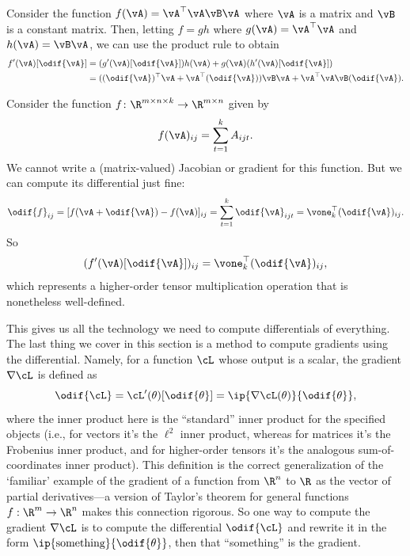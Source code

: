 \documentclass[../../book-main.tex]{subfiles}
\begin{document}
\begin{example}
    Consider the function \(f(\vA) = \vA^{\top}\vA\vB\vA\) where
    \(\vA\) is a matrix and \(\vB\) is a constant matrix. Then,
    letting \(f = gh\) where \(g(\vA) = \vA^{\top}\vA\) and \(h(\vA)
    = \vB\vA\), we can use the product rule to obtain
    \begin{align}
        f^{\prime}(\vA)[\odif{\vA}]
        &= (g^{\prime}(\vA)[\odif{\vA}])h(\vA) +
        g(\vA)(h^{\prime}(\vA)[\odif{\vA}]) \\
        &= ((\odif{\vA})^{\top}\vA + \vA^{\top}(\odif{\vA}))\vB\vA +
        \vA^{\top}\vA\vB(\odif{\vA}).
    \end{align}
\end{example}

\begin{example}
    Consider the function \(f \colon \R^{m \times n \times k} \to
    \R^{m \times n}\) given by
    \begin{equation}
        f(\vA)_{ij} = \sum_{t = 1}^{k}A_{ijt}.
    \end{equation}
    We cannot write a (matrix-valued) Jacobian or gradient for this
    function. But we can compute its differential just fine:
    \begin{equation}
        \odif{f}_{ij} = [f(\vA + \odif{\vA}) - f(\vA)]_{ij} = \sum_{t
        = 1}^{k}\odif{\vA}_{ijt} = \vone_{k}^{\top}(\odif{\vA})_{ij}.
    \end{equation}
    So
    \begin{equation}
        (f^{\prime}(\vA)[\odif{\vA}])_{ij} = \vone_{k}^{\top}(\odif{\vA})_{ij},
    \end{equation}
    which represents a higher-order tensor multiplication operation
    that is nonetheless well-defined.
\end{example}

This gives us all the technology we need to compute differentials of everything.
The last thing we cover in this section is a method to compute gradients using
the differential. Namely, for a function \(\cL\) whose output is a scalar, the
gradient \(\nabla \cL\) is defined as
\begin{equation}
    \odif{\cL} = \cL^{\prime}(\theta)[\odif{\theta}] = \ip{\nabla
    \cL(\theta)}{\odif{\theta}},
\end{equation}
where the inner product here is the ``standard'' inner product for
the specified objects (i.e., for vectors it's the \(\ell^{2}\) inner
    product, whereas for matrices it's the Frobenius inner product, and
for higher-order tensors it's the analogous sum-of-coordinates inner product).
This definition is the correct generalization of the `familiar' example of the
gradient of a function from $\R^n$ to $\R$ as the vector of partial
derivatives---a version of Taylor's theorem for general functions $f : \R^m \to
\R^n$ makes this connection rigorous.
So one way to compute the gradient \(\nabla \cL\) is to compute the differential
\(\odif{\cL}\) and rewrite it in the form
\(\ip{\text{something}}{\odif{\theta}}\), then that ``something'' is the
gradient.
\end{document}
